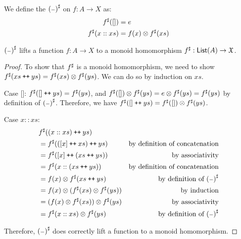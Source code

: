 \begin{definition}
We define the ${({\scriptstyle{-}})}^{\sharp}$ on $f : A \to X$ as:
\begin{align*}
    {f}^{\sharp}([]) & = e \\
    {f}^{\sharp}(x :: xs) & =  f(x) \otimes {f}^{\sharp}(xs)
\end{align*} 
\end{definition}

\begin{propositionrep}
    ${({\scriptstyle{-}})}^{\sharp}$ lifts a function $f : A \to X$ to a monoid homomorphism ${f}^{\sharp} : \operatorname{\mathsf{List}}(A) \to \mathfrak{X}$.
\end{propositionrep}

\begin{proof}
    To show that ${f}^{\sharp}$ is a monoid homomorphism,
    we need to show ${f}^{\sharp}(xs \mathbin{\text{\ttfamily\upshape ++}} ys) = {f}^{\sharp}(xs) \otimes {f}^{\sharp}(ys)$.
    We can do so by induction on $xs$.

    Case []:
    ${f}^{\sharp}([] \mathbin{\text{\ttfamily\upshape ++}} ys) = {f}^{\sharp}(ys)$,
    and ${f}^{\sharp}([]) \otimes {f}^{\sharp}(ys) = e \otimes {f}^{\sharp}(ys) = {f}^{\sharp}(ys)$
    by definition of ${({\scriptstyle{-}})}^{\sharp}$. Therefore, we have
    ${f}^{\sharp}([] \mathbin{\text{\ttfamily\upshape ++}} ys) = {f}^{\sharp}([]) \otimes {f}^{\sharp}(ys)$.

    Case $x :: xs$:
    \begin{align*}
        & {f}^{\sharp}((x :: xs) \mathbin{\text{\ttfamily\upshape ++}} ys) \\
        & = {f}^{\sharp}(([ x ] \mathbin{\text{\ttfamily\upshape ++}} xs) \mathbin{\text{\ttfamily\upshape ++}} ys) & \text{by definition of concatenation} \\
        & = {f}^{\sharp}([ x ] \mathbin{\text{\ttfamily\upshape ++}} (xs \mathbin{\text{\ttfamily\upshape ++}} ys)) & \text{by associativity} \\
        & = {f}^{\sharp}(x :: (xs \mathbin{\text{\ttfamily\upshape ++}} ys)) & \text{by definition of concatenation} \\
        & = f(x) \otimes {f}^{\sharp}(xs \mathbin{\text{\ttfamily\upshape ++}} ys) & \text{by definition of ${({\scriptstyle{-}})}^{\sharp}$} \\
        & = f(x) \otimes ({f}^{\sharp}(xs) \otimes {f}^{\sharp}(ys)) & \text{by induction} \\
        & = (f(x) \otimes {f}^{\sharp}(xs)) \otimes {f}^{\sharp}(ys) & \text{by associativity} \\
        & = {f}^{\sharp}(x :: xs) \otimes {f}^{\sharp}(ys) & \text{by definition of ${({\scriptstyle{-}})}^{\sharp}$} \\
    \end{align*}

    Therefore, ${({\scriptstyle{-}})}^{\sharp}$ does correctly lift a function to a monoid homomorphism.
\end{proof}

